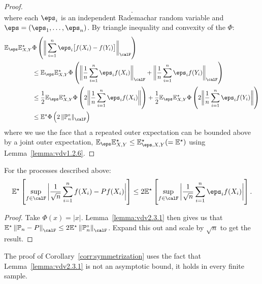 \begin{proof}
\[	.\]
	where each \(\eps_i\) is an independent Rademachar random variable and  \(\eps = (\eps_1,\dots,\eps_n)\). By triangle inequality and convexity of the \(\Phi\):
	\begin{align*}
		\E_\eps\E^\star_{X,Y}&\Phi\left(\bigg\|\sum_{i=1}^n \eps_i\big[f(X_i)-f(Y_i)\big]\bigg\|_\calF\right)\\ 
		&\leq \E_\eps\E^\star_{X,Y}\Phi\left(\bigg\|\frac{1}{n}\sum_{i=1}^n \eps_if(X_i)\bigg\|_\calF + \bigg\|\frac{1}{n}\sum_{i=1}^n \eps_if(Y_i) \bigg\|_\calF\right)\\
		&\leq  \frac{1}{2}\E_\eps\E^\star_{X,Y}\Phi\left(2\bigg\|\frac{1}{n} \sum_{i=1}^n \eps_if(X_i)\bigg\|\right) + \frac{1}{2}\E_\eps\E^\star_{X,Y}\Phi\left(2\bigg\|\frac{1}{n} \sum_{i=1}^n \eps_if(Y_i)\bigg\|\right) \\
		&\leq \E^\star\Phi\left(2\left\|\P_n^\circ\right\|_\calF\right)
	\end{align*}
	where we use the face that a repeated outer expectation can be bounded above by a joint outer expectation, \(\E_\eps\E^\star_{X,Y} \leq \E^\star_{\eps,X,Y} (=\E^\star)\) using Lemma~\ref{lemma:vdv1.2.6}.
\end{proof}

\begin{corollary}
    \label{corr:symmetrization}
	For the processes described above:
	\[
		\E^\star\left[\sup_{f\in\calF}\bigg|\frac{1}{\sqrt{n}}\sum_{i=1}^n f(X_i)- P f(X_i)\bigg| \right] \leq 2\E^\star \left[\sup_{f\in\calF}\bigg|\frac{1}{\sqrt{n}}\sum_{i=1}^n \eps_if(X_i)\bigg|\right]
	.\] 
\end{corollary}
\begin{proof}
	Take \(\Phi(x) = |x|\). Lemma~\ref{lemma:vdv2.3.1} then gives us that \(\E^\star\left\|\P_n - P\right\|_\calF \leq 2\E^\star\left\|\P_n^\circ\right\|_\calF\). Expand this out and scale by \(\sqrt{n}\) to get the result.  
\end{proof}
\begin{remark*}
	The proof of Corollary~\ref{corr:symmetrization} uses the fact that Lemma~\ref{lemma:vdv2.3.1} is not an asymptotic bound, it holds in every finite sample.
\end{remark*}

